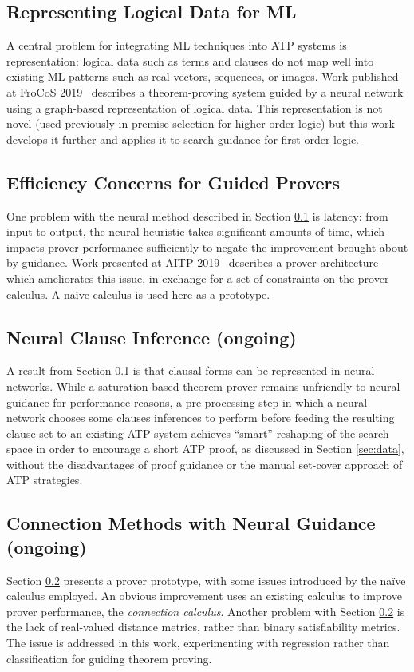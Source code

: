\documentclass[a4paper]{article}
\begin{document}
\subsection{Representing Logical Data for ML}
\label{sec:representation}
A central problem for integrating ML techniques into ATP systems is representation: logical data such as terms and clauses do not map well into existing ML patterns such as real vectors, sequences, or images.
Work published at FroCoS 2019~\cite{frocos2019} describes a theorem-proving system guided by a neural network using a graph-based representation of logical data.
This representation is not novel (used previously in premise selection for higher-order logic) but this work develops it further and applies it to search guidance for first-order logic.

\subsection{Efficiency Concerns for Guided Provers}
\label{sec:efficiency}
One problem with the neural method described in Section \ref{sec:representation} is latency: from input to output, the neural heuristic takes significant amounts of time, which impacts prover performance sufficiently to negate the improvement brought about by guidance.
Work presented at AITP 2019~\cite{aitp2019} describes a prover architecture which ameliorates this issue, in exchange for a set of constraints on the prover calculus.
A na\"ive calculus is used here as a prototype.

\subsection{Neural Clause Inference (ongoing)}
\label{sec:clauses}
A result from Section \ref{sec:representation} is that clausal forms can be represented in neural networks.
While a saturation-based theorem prover remains unfriendly to neural guidance for performance reasons, a pre-processing step in which a neural network chooses some clauses inferences to perform before feeding the resulting clause set to an existing ATP system achieves ``smart'' reshaping of the search space in order to encourage a short ATP proof, as discussed in Section \ref{sec:data}, without the disadvantages of proof guidance or the manual set-cover approach of ATP strategies.

\subsection{Connection Methods with Neural Guidance (ongoing)}
\label{sec:distance}
Section \ref{sec:efficiency} presents a prover prototype, with some issues introduced by the na\"ive calculus employed.
An obvious improvement uses an existing calculus to improve prover performance, the \emph{connection calculus}.
Another problem with Section \ref{sec:efficiency} is the lack of real-valued distance metrics, rather than binary satisfiability metrics.
The issue is addressed in this work, experimenting with regression rather than classification for guiding theorem proving.
\end{document}
